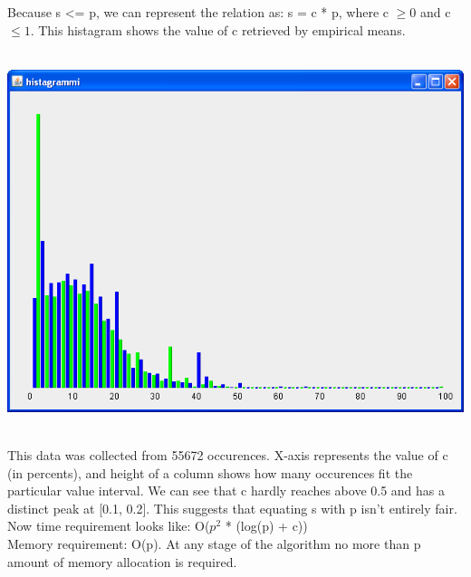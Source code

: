 \documentclass[a4paper,12pt]{article}
\begin{document}
Because s \textless = p, we can represent the relation as: s = c * p, where c $\geq{0}$ and c $\leq{1}$. This histagram shows the value of c retrieved by empirical means.\\ \\
\centerline{\includegraphics[scale=0.5]{histagram.png}} \hspace*{\fill} \\
This data was collected from 55672 occurences. X-axis represents the value of c (in percents), and height of a column shows how many occurences fit the particular value interval. We can see that c hardly reaches above 0.5 and has a distinct peak at [0.1, 0.2]. This suggests that equating s with p isn't entirely fair. Now time requirement looks like: O($p^{2}$ * (log(p) + c))\\
Memory requirement: O(p). At any stage of the algorithm no more than p amount of memory allocation is required.
\end{document}
